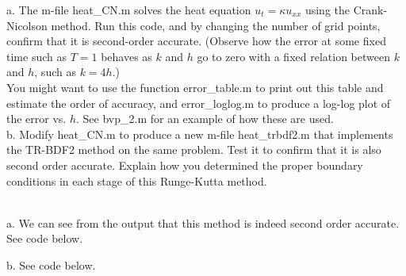 a. The m-file heat\_CN.m solves the heat equation $u_t=\kappa u_{xx}$ using the Crank-Nicolson method.
Run this code, and by changing the number of grid points, confirm that it is second-order accurate.
(Observe how the error at some fixed time such as $T= 1$ behaves as $k$ and $h$ go to zero with a fixed
relation between $k$ and $h$, such as $k= 4h$.)\\
You might want to use the function error\_table.m to print out this table and estimate the order of
accuracy, and error\_loglog.m to produce a log-log plot of the error vs. $h$. See bvp\_2.m for an
example of how these are used.\\
b. Modify heat\_CN.m to produce a new m-file heat\_trbdf2.m that implements the TR-BDF2 method on the
same problem. Test it to confirm that it is also second order accurate. Explain how you determined the
proper boundary conditions in each stage of this Runge-Kutta method.\\

\begin{solution}\renewcommand{\qedsymbol}{}\ \\
    a. We can see from the output that this method is indeed second order accurate. See code below.

    b. See code below.

\end{solution}

\newpage

\newpage
